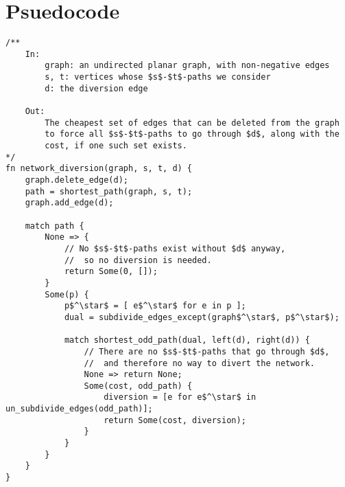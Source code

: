 \section{Psuedocode}
\begin{lstlisting}[caption={Main},label=Listing,mathescape=true]
/**
    In:
        graph: an undirected planar graph, with non-negative edges 
        s, t: vertices whose $s$-$t$-paths we consider
        d: the diversion edge

    Out:
        The cheapest set of edges that can be deleted from the graph 
        to force all $s$-$t$-paths to go through $d$, along with the 
        cost, if one such set exists.
*/
fn network_diversion(graph, s, t, d) {
    graph.delete_edge(d);
    path = shortest_path(graph, s, t);
    graph.add_edge(d);

    match path {
        None => {
            // No $s$-$t$-paths exist without $d$ anyway,
            //  so no diversion is needed.
            return Some(0, []);
        }
        Some(p) {
            p$^\star$ = [ e$^\star$ for e in p ];
            dual = subdivide_edges_except(graph$^\star$, p$^\star$);

            match shortest_odd_path(dual, left(d), right(d)) {
                // There are no $s$-$t$-paths that go through $d$,
                //  and therefore no way to divert the network.
                None => return None;
                Some(cost, odd_path) {
                    diversion = [e for e$^\star$ in un_subdivide_edges(odd_path)];
                    return Some(cost, diversion);
                }
            }
        }
    }
}
\end{lstlisting}
